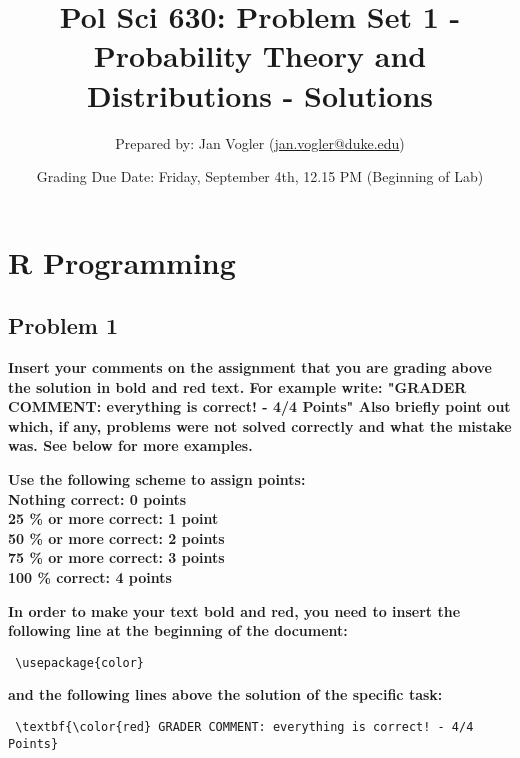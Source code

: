 \documentclass[12pt,letter]{article}\usepackage[]{graphicx}\usepackage[]{color}
\begin{document}
\title{Pol Sci 630: Problem Set 1 - Probability Theory and Distributions - Solutions}

\author{Prepared by: Jan Vogler (\href{mailto:jan.vogler@duke.edu}{jan.vogler@duke.edu})}

\date{Grading Due Date: Friday, September 4th, 12.15 PM (Beginning of Lab)}
 
\maketitle 



\section*{R Programming}

\subsection*{Problem 1}

\textbf{\color{red} Insert your comments on the assignment that you are grading above the solution in bold and red text. For example write: "GRADER COMMENT: everything is correct! - 4/4 Points" Also briefly point out which, if any, problems were not solved correctly and what the mistake was. See below for more examples.}

\bigskip

\textbf{Use the following scheme to assign points: \\
Nothing correct: 0 points \\ 
25 \% or more correct: 1 point \\
50 \% or more correct: 2 points \\
75 \% or more correct: 3 points \\
100 \% correct: 4 points}

\bigskip

\textbf{In order to make your text bold and red, you need to insert the following line at the beginning of the document:}

\begin{verbatim} \usepackage{color} \end{verbatim}

\textbf{and the following lines above the solution of the specific task:}

\begin{verbatim} \textbf{\color{red} GRADER COMMENT: everything is correct! - 4/4 Points} \end{verbatim}
\end{document}
